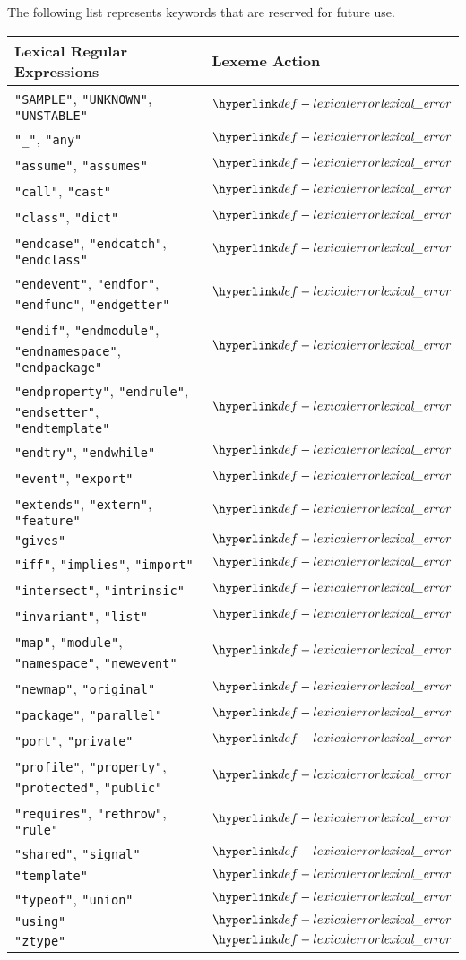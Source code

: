 The following list represents keywords that are reserved for future use.
\begin{center}
\begin{tabular}{ll}
\textbf{Lexical Regular Expressions} & \textbf{Lexeme Action}\\
\hline
\texttt{"SAMPLE"}, \texttt{"UNKNOWN"}, \texttt{"UNSTABLE"} & $\lexicalerror$ \\
\texttt{"\_"}, \texttt{"any"} & $\lexicalerror$ \\
\texttt{"assume"}, \texttt{"assumes"} & $\lexicalerror$ \\
\texttt{"call"}, \texttt{"cast"} & $\lexicalerror$ \\
\texttt{"class"}, \texttt{"dict"} & $\lexicalerror$ \\
\texttt{"endcase"}, \texttt{"endcatch"}, \texttt{"endclass"} & $\lexicalerror$ \\
\texttt{"endevent"}, \texttt{"endfor"}, \texttt{"endfunc"}, \texttt{"endgetter"} & $\lexicalerror$ \\
\texttt{"endif"}, \texttt{"endmodule"}, \texttt{"endnamespace"}, \texttt{"endpackage"} & $\lexicalerror$ \\
\texttt{"endproperty"}, \texttt{"endrule"}, \texttt{"endsetter"}, \texttt{"endtemplate"} & $\lexicalerror$ \\
\texttt{"endtry"}, \texttt{"endwhile"} & $\lexicalerror$ \\
\texttt{"event"}, \texttt{"export"} & $\lexicalerror$ \\
\texttt{"extends"}, \texttt{"extern"}, \texttt{"feature"} & $\lexicalerror$ \\
\texttt{"gives"} & $\lexicalerror$ \\
\texttt{"iff"}, \texttt{"implies"}, \texttt{"import"} & $\lexicalerror$ \\
\texttt{"intersect"}, \texttt{"intrinsic"} & $\lexicalerror$ \\
\texttt{"invariant"}, \texttt{"list"} & $\lexicalerror$ \\
\texttt{"map"}, \texttt{"module"}, \texttt{"namespace"}, \texttt{"newevent"} & $\lexicalerror$ \\
\texttt{"newmap"}, \texttt{"original"} & $\lexicalerror$ \\
\texttt{"package"}, \texttt{"parallel"} & $\lexicalerror$ \\
\texttt{"port"}, \texttt{"private"} & $\lexicalerror$ \\
\texttt{"profile"}, \texttt{"property"}, \texttt{"protected"}, \texttt{"public"} & $\lexicalerror$ \\
\texttt{"requires"}, \texttt{"rethrow"}, \texttt{"rule"} & $\lexicalerror$ \\
\texttt{"shared"}, \texttt{"signal"} & $\lexicalerror$ \\
\texttt{"template"} & $\lexicalerror$ \\
\texttt{"typeof"}, \texttt{"union"} & $\lexicalerror$ \\
\texttt{"using"} & $\lexicalerror$ \\
\texttt{"ztype"} & $\lexicalerror$ \\
\hline
\end{tabular}
\end{center}

